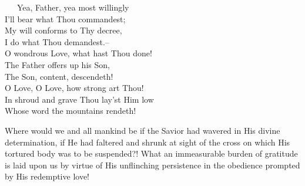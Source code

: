 \documentclass[
]{book}
\begin{document}
~~~Yea, Father, yea most willingly\\
\hspace*{0.333em}\hspace*{0.333em}\hspace*{0.333em}I'll bear what Thou commandest;\\
\hspace*{0.333em}\hspace*{0.333em}\hspace*{0.333em}My will conforms to Thy decree,\\
\hspace*{0.333em}\hspace*{0.333em}\hspace*{0.333em}I do what Thou demandest.--\\
\hspace*{0.333em}\hspace*{0.333em}\hspace*{0.333em}O wondrous Love, what hast Thou done!\\
\hspace*{0.333em}\hspace*{0.333em}\hspace*{0.333em}The Father offers up his Son,\\
\hspace*{0.333em}\hspace*{0.333em}\hspace*{0.333em}The Son, content, descendeth!\\
\hspace*{0.333em}\hspace*{0.333em}\hspace*{0.333em}O Love, O Love, how strong art Thou!\\
\hspace*{0.333em}\hspace*{0.333em}\hspace*{0.333em}In shroud and grave Thou lay'st Him low\\
\hspace*{0.333em}\hspace*{0.333em}\hspace*{0.333em}Whose word the mountains rendeth!

Where would we and all mankind be if the Savior had wavered in His divine determination, if He had faltered and shrunk at sight of the cross on which His tortured body was to be suspended?! What an immeasurable burden of gratitude is laid upon us by virtue of His unflinching persistence in the obedience prompted by His redemptive love!
\end{document}
